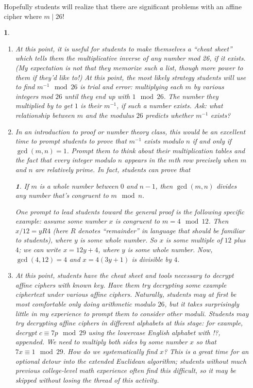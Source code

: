 \documentclass[11pt]{article}
\theoremstyle{plain}
\theoremstyle{remark}
\theoremstyle{definition}
\theoremstyle{definition}
\theoremstyle{definition}
\theoremstyle{plain}
\theoremstyle{plain}
\newtheorem{prop}[thm]{\protect\propositionname}
\theoremstyle{plain}
\newtheorem{act}[thm]{\protect\activityname}
\theoremstyle{definition}
\providecommand{\propositionname}{Proposition}
\providecommand{\activityname}{Activity}
\begin{document}
Hopefully students will realize that there are significant problems
with an affine cipher where $m\mid26$! 

\begin{act}
	
\begin{enumerate}
\item At this point, it is useful for students to make themselves a ``cheat sheet'' which tells them
the multiplicative inverse of any number mod 26, if it exists. (My
expectation is not that they memorize such a list, though more power
to them if they'd like to!) At this point, the most likely strategy
students will use to find $m^{-1}\mod26$ is trial and error: multiplying
each $m$ by various integers mod $26$ until they end up with $1\mod26$.
The number they multiplied by to get $1$ is their $m^{-1}$, if such
a number exists. Ask: what relationship between $m$ and the modulus
$26$ predicts whether $m^{-1}$ exists?

\item In an introduction to proof or number theory class, this would be
an excellent time to prompt students to prove that $m^{-1}$ exists
modulo $n$ if and only if $\gcd(m,n)=1$. Prompt them to think about
their multiplication tables and the fact that every integer modulo
$n$ appears in the $m$th row precisely when $m$ and $n$ are relatively
prime. In fact, students can prove that 
\begin{prop}
\label{KI-prop:gcd(m,n)-divides-mk}If $m$ is a whole number between
$0$ and $n-1$, then $\gcd(m,n)$ divides any number that's congruent
to $m\mod n$. 
\end{prop}

One prompt to lead students toward the general proof is the following
specific example: assume some number $x$ is congruent to $m=4\mod12$.
Then $x/12=yR4$ (here $R$ denotes ``remainder'' in language that
should be familiar to students), where $y$ is some whole number.
So $x$ is some multiple of $12$ plus $4$; we can write $x=12y+4$,
where $y$ is some whole number. Now, $\gcd(4,12)=4$ and $x=4(3y+1)$
is divisible by $4$. 

\item At this point, students have the cheat sheet and tools necessary to
decrypt affine ciphers with known key. Have them try decrypting some
example ciphertext under various affine ciphers. Naturally, students
may at first be most comfortable only doing arithmetic modulo $26$,
but it takes surprisingly little in my experience to prompt them to
consider other moduli. Students may try decrypting affine
ciphers in different alphabets at this stage: for example, decrypt
$c\equiv7p\mod29$ using the lowercase English alphabet with !?, appended.
We need to multiply both sides by some number $x$ so that $7x\equiv1\mod29$.
How do we systematically find $x$? This is a great time for an optional
detour into the extended Euclidean algorithm; students without much
previous college-level math experience often find this difficult,
so it may be skipped without losing the thread of this activity.


\end{enumerate}
\end{act}
\end{document}
